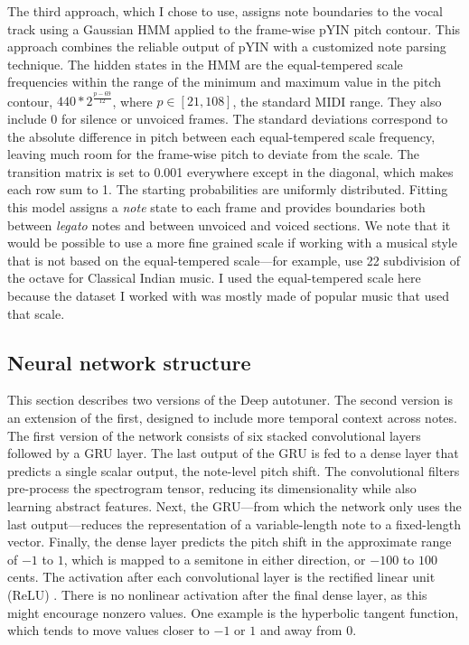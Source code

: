 The third approach, which I chose to use, assigns note boundaries to the vocal track using a Gaussian HMM applied to the frame-wise pYIN pitch contour. This approach combines the reliable output of pYIN with a customized note parsing technique. The hidden states in the HMM are the equal-tempered scale frequencies within the range of the minimum and maximum value in the pitch contour, $440 * 2^{\frac{p - 69}{12}}$, where $p \in [21, 108]$, the standard MIDI range. They also include 0 for silence or unvoiced frames. The standard deviations correspond to the absolute difference in pitch between each equal-tempered scale frequency, leaving much room for the frame-wise pitch to deviate from the scale. The transition matrix is set to 0.001 everywhere except in the diagonal, which makes each row sum to 1. The starting probabilities are uniformly distributed. Fitting this model assigns a \textit{note} state to each frame and provides boundaries both between \textit{legato} notes and between unvoiced and voiced sections. We note that it would be possible to use a more fine grained scale if working with a musical style that is not based on the equal-tempered scale---for example, use 22 subdivision of the octave for Classical Indian music. I used the equal-tempered scale here because the dataset I worked with was mostly made of popular music that used that scale.  

\subsection{Neural network structure}
This section describes two versions of the Deep autotuner. The second version is an extension of the first, designed to include more temporal context across notes. The first version of the network consists of six stacked convolutional layers followed by a GRU layer. The last output of the GRU is fed to a dense layer that predicts a single scalar output, the note-level pitch shift. The convolutional filters pre-process the spectrogram tensor, reducing its dimensionality while also learning abstract features. Next, the GRU---from which the network only uses the last output---reduces the representation of a variable-length note to a fixed-length vector. Finally, the dense layer predicts the pitch shift in the approximate range of $-1$ to $1$, which is mapped to a semitone in either direction, or $-100$ to $100$ cents. The activation after each convolutional layer is the rectified linear unit (ReLU) \cite{he2015delving}. There is no nonlinear activation after the final dense layer, as this might encourage nonzero values. One example is the hyperbolic tangent function, which tends to move values closer to $-1$ or $1$ and away from 0. 

